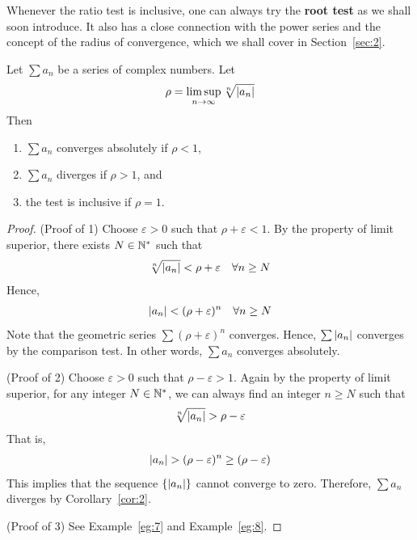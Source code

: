 \documentclass[thmcnt=section, 12pt]{my-elegantbook}
\begin{document}

Whenever the ratio test is inclusive, one can always try the \textbf{root test} as we shall soon introduce. It also has a close connection with the power series and the concept of the radius of convergence, which we shall cover in Section~\ref{sec:2}.

\begin{theorem} \label{thm:55}
    Let $\sum a_n$ be a series of complex numbers. Let
    \begin{align*}
        \rho = \limsup_{n \to \infty} \sqrt[n]{\left\lvert a_n \right\rvert}
    \end{align*}
    Then
    \begin{enumerate}
        \item $\sum a_n$ converges absolutely if $\rho < 1$,
        \item $\sum a_n$ diverges if $\rho > 1$, and
        \item the test is inclusive if $\rho = 1$.
    \end{enumerate}
\end{theorem}

\begin{proof}
    (Proof of 1) Choose $\varepsilon > 0$ such that $\rho + \varepsilon < 1$. By the property of limit superior, there exists $N \in \mathbb{N}^\ast$ such that
    \begin{align*}
        \sqrt[n]{\left\lvert a_n \right\rvert} < \rho + \varepsilon
        \quad \forall n \geq N
    \end{align*}
    Hence,
    \begin{align*}
        \left\lvert a_n \right\rvert < (\rho+\varepsilon)^n
        \quad \forall n \geq N
    \end{align*}
    Note that the geometric series $\sum (\rho+\varepsilon)^n$ converges. Hence, $\sum \left\lvert a_n \right\rvert$ converges by the comparison test. In other words, $\sum a_n$ converges absolutely.

    (Proof of 2) Choose $\varepsilon > 0$ such that $\rho-\varepsilon > 1$. Again by the property of limit superior, for any integer $N \in \mathbb{N}^\ast$, we can always find an integer $n \geq N$ such that
    \begin{align*}
        \sqrt[n]{\left\lvert a_n \right\rvert} > \rho - \varepsilon
    \end{align*}
    That is,
    \begin{align*}
        \left\lvert a_n \right\rvert > (\rho - \varepsilon)^n
        \geq (\rho - \varepsilon)
    \end{align*}
    This implies that the sequence $\{\left\lvert a_n \right\rvert\}$ cannot converge to zero. Therefore, $\sum a_n$ diverges by Corollary~\ref{cor:2}.

    (Proof of 3) See Example~\ref{eg:7} and Example~\ref{eg:8}.
\end{proof}
\end{document}
